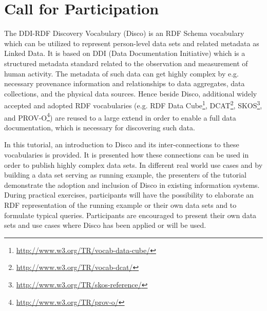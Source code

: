 \documentclass{llncs}
\begin{document}
%

\section{Call for Participation}
The DDI-RDF Discovery Vocabulary (Disco) \cite{Bosch2012} is an RDF Schema vocabulary which can be utilized to represent person-level data sets and related metadata as Linked Data. 
It is based on DDI (Data Documentation Initiative) which is a structured metadata standard related to the observation and measurement of human activity.
The metadata of such data can get highly complex by e.g. necessary provenance information and relationships to data aggregates, data collections, and the physical data sources.
Hence beside Disco, additional widely accepted and adopted RDF vocabularies (e.g. RDF Data Cube\footnote{\url{http://www.w3.org/TR/vocab-data-cube/}}, DCAT\footnote{\url{http://www.w3.org/TR/vocab-dcat/}}, SKOS\footnote{\url{http://www.w3.org/TR/skos-reference/}}, and PROV-O\footnote{\url{http://www.w3.org/TR/prov-o/}}) are reused to a large extend \cite{Bosch2013} in order to enable a full data documentation, which is necessary for discovering such data.

In this tutorial, an introduction to Disco and its inter-connections to these vocabularies is provided. 
It is presented how these connections can be used in order to publish highly complex data sets.
In different real world use cases and by building a data set serving as running example, the presenters of the tutorial demonstrate the adoption and inclusion of Disco in existing information systems.
During practical exercises, participants will have the possibility to elaborate an RDF representation of the running example or their own data sets and to formulate typical queries.
Participants are encouraged to present their own data sets and use cases where Disco has been applied or will be used. 
\end{document}
